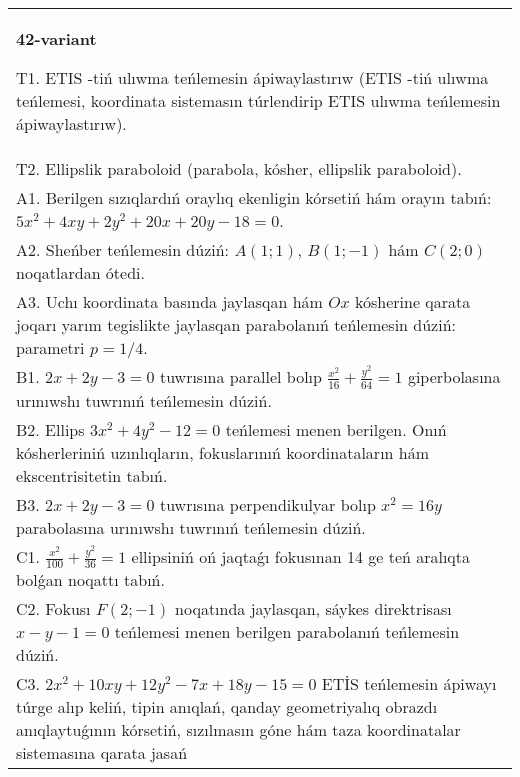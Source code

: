 \documentclass{article}
\begin{document}
\begin{tabular}{m{17cm}}
\textbf{42-variant}
\newline

T1. ETIS -tiń ulıwma teńlemesin ápiwaylastırıw (ETIS -tiń ulıwma teńlemesi, koordinata sistemasın túrlendirip ETIS ulıwma teńlemesin ápiwaylastırıw).\\

T2. Ellipslik paraboloid (parabola, kósher, ellipslik paraboloid).\\

A1. Berilgen sızıqlardıń oraylıq ekenligin kórsetiń hám orayın tabıń: $5 x^{2}+4 xy+2 y^{2}+20 x+20 y-18=0$.\\

A2. Sheńber teńlemesin dúziń: $A (1;1) $, $B (1;-1) $ hám $C (2;0) $ noqatlardan ótedi.\\

A3. Uchı koordinata basında jaylasqan hám $Ox$ kósherine qarata joqarı yarım tegislikte jaylasqan parabolanıń teńlemesin dúziń: parametri $p=1/4$.\\

B1. $2x + 2y - 3 = 0$ tuwrısına parallel bolıp $\frac{x^{2}}{16} + \frac{y^{2}}{64} = 1$ giperbolasına urınıwshı tuwrınıń teńlemesin dúziń.  \\

B2. Ellips $3x^{2} + 4y^{2} - 12 = 0$ teńlemesi menen berilgen. Onıń kósherleriniń uzınlıqların, fokuslarınıń koordinataların hám ekscentrisitetin tabıń.  \\

B3. $2x + 2y - 3 = 0$ tuwrısına perpendikulyar bolıp $x^{2} = 16y$ parabolasına urınıwshı tuwrınıń teńlemesin dúziń.  \\

C1. $\frac{x^{2}}{100} + \frac{y^{2}}{36} = 1$ ellipsiniń oń jaqtaǵı fokusınan 14 ge teń aralıqta bolǵan noqattı tabıń.  \\

C2. Fokusı $F(2; - 1)$ noqatında jaylasqan, sáykes direktrisası $x - y - 1 = 0$ teńlemesi menen berilgen parabolanıń teńlemesin dúziń.  \\

C3. $2x^{2} + 10xy + 12y^{2} - 7x + 18y - 15 = 0$ ETİS teńlemesin ápiwayı túrge alıp keliń, tipin anıqlań, qanday geometriyalıq obrazdı anıqlaytuǵının kórsetiń, sızılmasın góne hám taza koordinatalar sistemasına qarata jasań  \\

\end{tabular}
\vspace{1cm}
\end{document}
